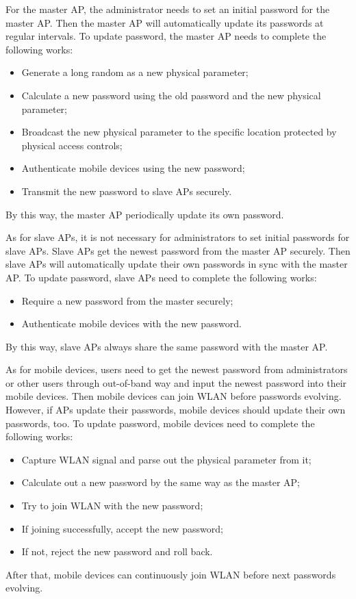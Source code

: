 For the master AP, the administrator needs to set an initial password for the master AP. Then the master AP will automatically update its passwords at regular intervals. To update password, the master AP needs to complete the following works: 
\begin{itemize}
	\item Generate a long random as a new physical parameter; 
	\item Calculate a new password using the old password and the new physical parameter; 
	\item Broadcast the new physical parameter to the specific location protected by physical access controls; 
	\item Authenticate mobile devices using the new password; 
	\item Transmit the new password to slave APs securely. 
\end{itemize}
By this way, the master AP periodically update its own password. 

As for slave APs, it is not necessary for administrators to set initial passwords for slave APs. Slave APs get the newest password from the master AP securely. Then slave APs will automatically update their own passwords in sync with the master AP. To update password, slave APs need to complete the following works: 
\begin{itemize}
	\item Require a new password from the master securely; 
	\item Authenticate mobile devices with the new password. 
\end{itemize}
By this way, slave APs always share the same password with the master AP. 

As for mobile devices, users need to get the newest password from administrators or other users through out-of-band way and input the newest password into their mobile devices. Then mobile devices can join WLAN before passwords evolving. However, if APs update their passwords, mobile devices should update their own passwords, too. To update password, mobile devices need to complete the following works: 
\begin{itemize}
	\item Capture WLAN signal and parse out the physical parameter from it; 
	\item Calculate out a new password by the same way as the master AP; 
	\item Try to join WLAN with the new password; 
	\item If joining successfully, accept the new password; 
	\item If not, reject the new password and roll back. 
\end{itemize}
After that, mobile devices can continuously join WLAN before next passwords evolving. 

